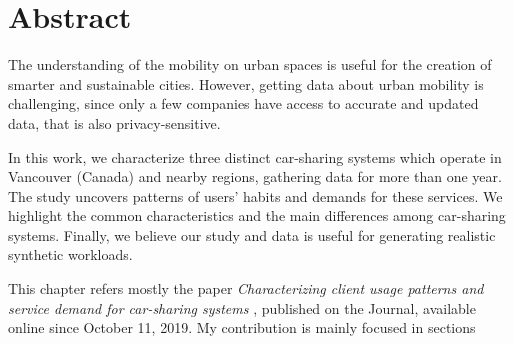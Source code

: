 \section{Abstract}
\label{sec:4_0_abstract}

The understanding of the mobility on urban spaces is useful for the creation of smarter and sustainable cities. However, getting data about urban mobility is challenging, since only a few companies have access to accurate and updated data, that is also privacy-sensitive. 

In this work, we characterize three distinct car-sharing systems which operate in Vancouver (Canada) and nearby regions, gathering data for more than one year. The study uncovers patterns of users' habits and demands for these services. 
We highlight the common characteristics and the main differences among car-sharing systems. Finally, we believe our study and data is useful for generating realistic synthetic workloads.

This chapter refers mostly the paper \textit{Characterizing client usage patterns and service demand for car-sharing systems} \cite{VancouverCS}, published on the Journal, available online since October 11, 2019. My contribution is mainly focused in sections 

